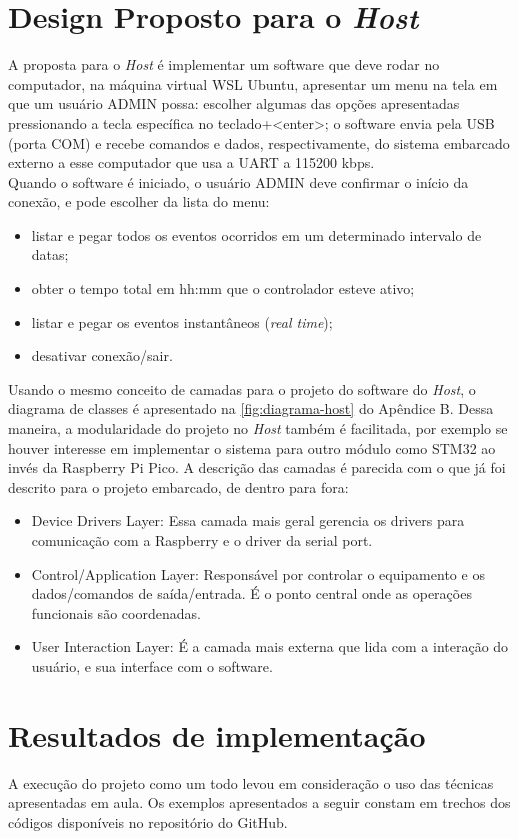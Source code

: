 \documentclass[10pt,twocolumn,letterpaper]{article}
\begin{document}
\section{Design Proposto para o \emph{Host}}
A proposta para o \emph{Host} é implementar um software que deve rodar no computador, na máquina 
virtual WSL Ubuntu, apresentar um menu na tela em que um usuário ADMIN possa: escolher algumas das opções 
apresentadas pressionando a tecla específica no teclado+<enter>; o software envia pela USB (porta COM) e recebe
comandos e dados, respectivamente, do sistema embarcado externo a esse computador que usa a UART a 115200 kbps.\\
Quando o software é iniciado, o usuário ADMIN deve confirmar o início da conexão, e pode escolher da lista do menu: 
\begin{itemize}
  \item listar e pegar todos os eventos ocorridos em um determinado intervalo de datas; 
  \item obter o tempo total em hh:mm que o controlador esteve ativo;
  \item listar e pegar os eventos instantâneos (\emph{real time});
  \item desativar conexão/sair.
\end{itemize}

Usando o mesmo conceito de camadas para o projeto do software do \emph{Host}, o diagrama de classes é apresentado na \autoref{fig:diagrama-host} do Apêndice B. 
Dessa maneira, a modularidade do projeto no \emph{Host} também é facilitada, por exemplo se houver interesse em implementar o sistema para outro módulo como STM32 ao invés da Raspberry Pi Pico. 
A descrição das camadas é parecida com o que já foi descrito para o projeto embarcado, de dentro para fora:
\begin{itemize}
  \item Device Drivers Layer: Essa camada mais geral gerencia os drivers para comunicação com a Raspberry e o driver da serial port.
  \item Control/Application Layer: Responsável por controlar o equipamento e os dados/comandos de saída/entrada. É o ponto central onde as operações 
  funcionais são coordenadas. 
  \item User Interaction Layer: É a camada mais externa que lida com a interação do usuário, e sua interface com o software.
\end{itemize}

\section{Resultados de implementação}
A execução do projeto como um todo levou em consideração o uso das técnicas apresentadas em aula. 
Os exemplos apresentados a seguir constam em trechos dos códigos disponíveis no repositório do GitHub\cite{src-github}. 
\end{document}
